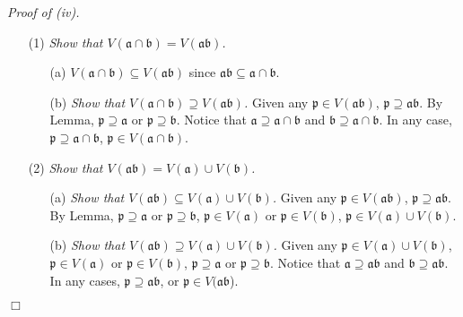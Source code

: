 \documentclass{article}
\begin{document}
\emph{Proof of (iv).}
\begin{enumerate}
\item[(1)]
\emph{Show that $V(\mathfrak{a} \cap \mathfrak{b}) = V(\mathfrak{a} \mathfrak{b})$.}
  \begin{enumerate}
  \item[(a)]
  \emph{$V(\mathfrak{a} \cap \mathfrak{b}) \subseteq V(\mathfrak{a} \mathfrak{b})$}
  since $\mathfrak{a} \mathfrak{b} \subseteq \mathfrak{a} \cap \mathfrak{b}$.
  \item[(b)]
  \emph{Show that $V(\mathfrak{a} \cap \mathfrak{b}) \supseteq V(\mathfrak{a} \mathfrak{b})$.}
  Given any $\mathfrak{p} \in V(\mathfrak{a} \mathfrak{b})$,
  $\mathfrak{p} \supseteq \mathfrak{a} \mathfrak{b}$.
  By Lemma, $\mathfrak{p} \supseteq \mathfrak{a}$ or $\mathfrak{p} \supseteq \mathfrak{b}$.
  Notice that $\mathfrak{a} \supseteq \mathfrak{a \cap b}$
  and $\mathfrak{b} \supseteq \mathfrak{a \cap b}$.
  In any case, $\mathfrak{p} \supseteq \mathfrak{a \cap b}$,
  $\mathfrak{p} \in V(\mathfrak{a} \cap \mathfrak{b})$.
  \end{enumerate}
\item[(2)]
\emph{Show that $V(\mathfrak{a} \mathfrak{b}) = V(\mathfrak{a}) \cup V(\mathfrak{b})$.}
  \begin{enumerate}
  \item[(a)]
  \emph{Show that $V(\mathfrak{a} \mathfrak{b}) \subseteq V(\mathfrak{a}) \cup V(\mathfrak{b})$.}
  Given any $\mathfrak{p} \in V(\mathfrak{a} \mathfrak{b})$,
  $\mathfrak{p} \supseteq \mathfrak{a} \mathfrak{b}$.
  By Lemma,
  $\mathfrak{p} \supseteq \mathfrak{a}$ or $\mathfrak{p} \supseteq \mathfrak{b}$,
  $\mathfrak{p} \in V(\mathfrak{a})$ or $\mathfrak{p} \in V(\mathfrak{b})$,
  $\mathfrak{p} \in V(\mathfrak{a}) \cup V(\mathfrak{b})$.
  \item[(b)]
  \emph{Show that $V(\mathfrak{a} \mathfrak{b}) \supseteq V(\mathfrak{a}) \cup V(\mathfrak{b})$.}
  Given any $\mathfrak{p} \in V(\mathfrak{a}) \cup V(\mathfrak{b})$,
  $\mathfrak{p} \in V(\mathfrak{a})$ or $\mathfrak{p} \in V(\mathfrak{b})$,
  $\mathfrak{p} \supseteq \mathfrak{a}$ or $\mathfrak{p} \supseteq \mathfrak{b}$.
  Notice that $\mathfrak{a} \supseteq \mathfrak{ab}$
  and $\mathfrak{b} \supseteq \mathfrak{ab}$.
  In any cases, $\mathfrak{p} \supseteq \mathfrak{ab}$,
  or $\mathfrak{p} \in V(\mathfrak{ab}$).
  \end{enumerate}
\end{enumerate}
$\Box$ \\\\
\end{document}
